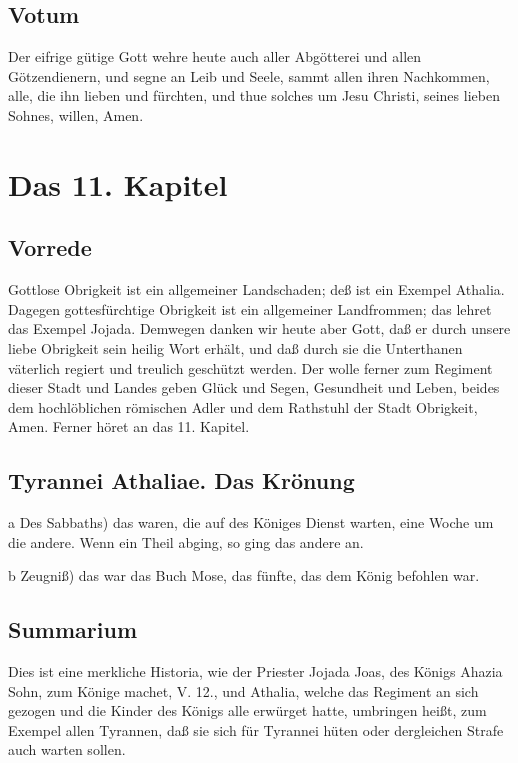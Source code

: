 \section{Votum}

Der eifrige gütige Gott wehre heute auch aller Abgötterei und allen Götzendienern, und segne an Leib und Seele, sammt allen ihren Nachkommen, alle, die ihn lieben und fürchten, und thue solches um Jesu Christi, seines lieben Sohnes, willen, Amen.

\chapter{Das 11. Kapitel}

\section{Vorrede}

Gottlose Obrigkeit ist ein allgemeiner Landschaden; deß ist ein Exempel Athalia. Dagegen gottesfürchtige Obrigkeit ist ein allgemeiner Landfrommen; das lehret das Exempel Jojada. Demwegen danken wir heute aber Gott, daß er durch unsere liebe Obrigkeit sein heilig Wort erhält, und daß durch sie die Unterthanen väterlich regiert und treulich geschützt werden. Der wolle ferner zum Regiment dieser Stadt und Landes geben Glück und Segen, Gesundheit und Leben, beides dem hochlöblichen römischen Adler und dem Rathstuhl der Stadt Obrigkeit, Amen. Ferner höret an das 11. Kapitel.

\section{Tyrannei Athaliae. Das Krönung}

a Des Sabbaths) das waren, die auf des Königes Dienst warten, eine Woche um die andere. Wenn ein Theil abging, so ging das andere an.

b Zeugniß) das war das Buch Mose, das fünfte, das dem König befohlen war.

\section{Summarium}

Dies ist eine merkliche Historia, wie der Priester Jojada Joas, des Königs Ahazia Sohn, zum Könige machet, V. 12., und Athalia, welche das Regiment an sich gezogen und die Kinder des Königs alle erwürget hatte, umbringen heißt, zum Exempel allen Tyrannen, daß sie sich für Tyrannei hüten oder dergleichen Strafe auch warten sollen.

